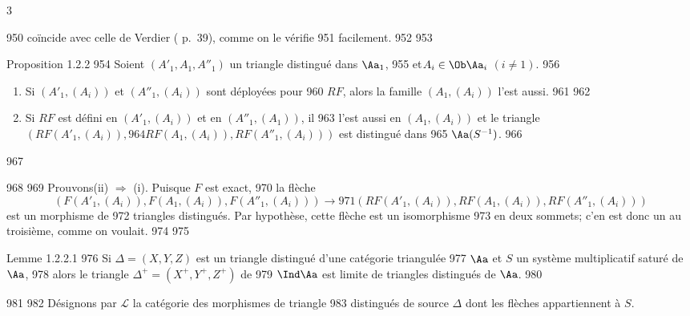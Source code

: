3	\documentclass[10pt]{../fichiers-configuration-latex/smfart}
\begin{document}
   950	coïncide avec celle de Verdier (\cite{CD} p.~39), comme on le vérifie
   951	facilement.
   952	
   953	\begin{enonce*}{Proposition 1.2.2}
   954	Soient $(A'_1, A_1,A''_1)$ un triangle distingué dans $\Aa_1$,
   955	et\break $A_i\in \Ob \Aa_i$ $(i\neq 1)$.
   956	\begin{enumerate}
   957	\renewcommand{\theenumi}{\roman{enumi}}
   958	\renewcommand{\labelenumi}{(\theenumi)}
   959	\item Si $(A'_{1},(A_{i}))$ et $(A''_{1},(A_{i}))$ sont déployées pour
   960	  $RF$, alors la famille $(A_{1},(A_{i}))$ l'est aussi.
   961	
   962	\item Si $RF$ est défini en $(A'_1, (A_i))$ et en $(A''_1, (A_1))$, il
   963	l'est aussi en $(A_1, (A_i))$ et le triangle $(RF(A'_1,(A_i)),
   964	RF(A_1,(A_i)),RF(A''_1,(A_i)))$ est distingué dans
   965	$\Aa(S^{-1})$.
   966	\end{enumerate}
   967	\end{enonce*}
   968	
   969	Prouvons\pageoriginale (ii) $\Rightarrow$ (i). Puisque $F$ est exact,
   970	la flèche $$(F(A'_1,(A_i)), F(A_1,(A_i)), F(A''_1,(A_i)))\rightarrow
   971	(RF(A'_1,(A_i)), RF(A_1,(A_i)), RF(A''_1,(A_i)))$$ est un morphisme de
   972	triangles distingués. Par hypothèse, cette flèche est un isomorphisme
   973	en deux sommets; c'en est donc un au troisième, comme on voulait.
   974	
   975	\begin{enonce*}{Lemme 1.2.2.1}
   976	Si $\Delta=(X,Y,Z)$ est un triangle distingué d'une catégorie triangulée
   977	$\Aa$ et $S$ un système multiplicatif saturé de $\Aa$,
   978	alors le triangle $\Delta^{+}=(X^{+},Y^{+},Z^{+})$ de
   979	$\Ind\Aa$ est limite de triangles distingués de $\Aa$.
   980	\end{enonce*}
   981	
   982	Désignons par $\mathcal{L}$ la catégorie des morphismes de triangle
   983	distingués de source $\Delta$ dont les flèches appartiennent à $S$.
\end{document}
